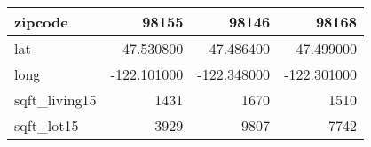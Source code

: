 \begin{table}[H]
\begin{tabular}{|l|r|r|r|}
\hline zipcode & \cellcolor[rgb]{0.9, 0.54, 0.52} 98155 & 98146 & 98168 \\
\hline lat & \cellcolor[rgb]{0.9, 0.54, 0.52} 47.530800 & 47.486400 & 47.499000 \\
\hline long & \cellcolor[rgb]{0.9, 0.54, 0.52} -122.101000 & \cellcolor[rgb]{0.9, 0.54, 0.52} -122.348000 & \cellcolor[rgb]{0.9, 0.54, 0.52} -122.301000 \\
\hline sqft\_living15 & \cellcolor[rgb]{0.9, 0.54, 0.52} 1431 & 1670 & 1510 \\
\hline sqft\_lot15 & \cellcolor[rgb]{0.9, 0.54, 0.52} 3929 & 9807 & 7742 \\
\hline
\end{tabular}
\end{table}
